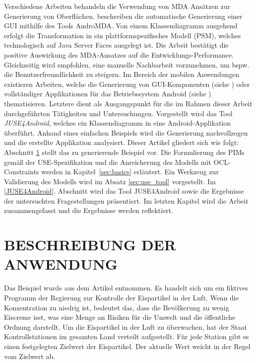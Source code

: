 \documentclass[a4paper,twoside]{article}
\begin{document}
Verschiedene Arbeiten behandeln die Verwendung von MDA Ansätzen zur Generierung von Oberflächen. \cite{GUI_MDA} beschreiben die automatische Generierung einer GUI mithilfe des Tools AndroMDA. Von einem Klassendiagramm ausgehend erfolgt die Transformation in ein plattformspezifisches Modell (PSM), welches technologisch auf Java Server Faces ausgelegt ist. Die Arbeit bestätigt die positive Auswirkung des MDA-Ansatzes auf die Entwicklungs-Performance. Gleichzeitig wird empfohlen, eine manuelle Nachbarbeit vorzunehmen, um bspw. die Benutzerfreundlichkeit zu steigern.
Im Bereich der mobilen Anwendungen existieren Arbeiten, welche die Generierung von GUI-Komponenten (siehe \cite{GUI_MDA_Android}) oder vollständiger Applikationen für das Betriebssystem Android (siehe \cite{JUSE}) thematisieren. Letztere dient als Ausgangspunkt für die im Rahmen dieser Arbeit durchgeführten Tätigkeiten und Untersuchungen. Vorgestellt wird das Tool \textit{JUSE4Android}, welches ein Klassendiagramm in eine Android-Applikation überführt. Anhand eines einfachen Beispiels wird die Generierung nachvollzogen und die erstellte Applikation analysiert. Dieser Artikel gliedert sich wie folgt: Abschnitt \ref{sec:iceCream} stellt das zu generierende Beispiel vor. Die Formulierung des PIMs gemäß der    
USE-Spezifikation und die Anreicherung des Modells mit OCL-Constraints werden in Kapitel~\ref{sec:basics} erläutert. Ein Werkzeug zur Validierung des Modells wird im  Absatz \ref{sec:use_tool} vorgestellt. Im \ref{JUSE4Android}. Abschnitt wird das Tool JUSE4Android sowie die Ergebnisse der untersuchten Fragestellungen präsentiert. Im letzten Kapitel wird die Arbeit zusammengefasst und die Ergebnisse werden reflektiert.

\section{\uppercase{Beschreibung der Anwendung}}
\label{sec:iceCream}
\noindent
Das Beispiel wurde aus dem Artikel \cite{Gui06} entnommen. Es handelt sich um ein fiktives Programm der Regierung zur Kontrolle der Eispartikel in der Luft. Wenn die Konzentration zu niedrig ist, bedeutet das, dass die Bevölkerung zu wenig Eiscreme isst, was eine Menge an Risiken für die Umwelt und die öffentliche Ordnung darstellt. Um die Eispartikel in der Luft zu überwachen, hat der Staat Kontrollstationen im gesamten Land verteilt aufgestellt. Für jede Station gibt es einen festgelegten Zielwert der Eispartikel. Der aktuelle Wert weicht in der Regel vom Zielwert ab. 
\end{document}
